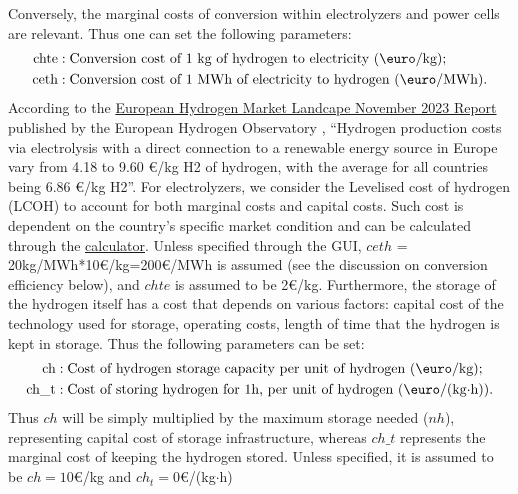 \documentclass[english]{article}
\numberwithin{definition}{section}
\numberwithin{theorem}{section}
\numberwithin{problem}{section}
\begin{document}
Conversely, the marginal costs of conversion within electrolyzers and power cells are relevant. Thus one can set the following parameters:
\begin{align*}
    \text{chte} & : \text{Conversion cost of 1 kg of hydrogen to electricity (\euro/kg);} \\
    \text{ceth} & : \text{Conversion cost of 1 MWh of electricity to hydrogen (\euro/MWh).}
\end{align*}
According to the \href{https://observatory.clean-hydrogen.europa.eu/sites/default/files/2023-11/Report%2001%20-%20November%202023%20-%20The%20European%20hydrogen%20market%20landscape.pdf}{European Hydrogen Market Landcape November 2023 Report} published by the European Hydrogen Observatory \cite{European_H2_Market_landscape} , ``Hydrogen production costs via electrolysis with a direct connection to a renewable energy source in Europe vary from 4.18 to 9.60 €/kg H2 of hydrogen, with the average for all countries being 6.86 €/kg H2''. For electrolyzers, we consider the Levelised cost of hydrogen (LCOH) to account for both marginal costs and capital costs. Such cost is dependent on the country's specific market condition and can be calculated through the \href{https://observatory.clean-hydrogen.europa.eu/tools-reports/levelised-cost-hydrogen-calculator}{calculator}. Unless specified through the GUI, $ceth$ = 20kg/MWh*10\euro/kg=200\euro/MWh is assumed (see the discussion on conversion efficiency below), and $chte$ is assumed to be 2\euro/kg. 
Furthermore, the storage of the hydrogen itself has a cost that depends on various factors: capital cost of the technology used for storage, operating costs, length of time that the hydrogen is kept in storage. Thus the following parameters can be set:
\begin{align*}
    \text{ch} & : \text{Cost of hydrogen storage capacity per unit of hydrogen (\euro/kg);} \\
    \text{ch\_t} & : \text{Cost of storing hydrogen for 1h, per unit of hydrogen (\euro/(kg$\cdot$h)).}
\end{align*}
Thus $ch$ will be simply multiplied by the maximum storage needed ($nh$), representing capital cost of storage infrastructure, whereas $ch\_t$ represents the marginal cost of keeping the hydrogen stored.  Unless specified, it is assumed to be $ch=10$\euro/kg and $ch_t=0$\euro/(kg$\cdot$h)
\end{document}
